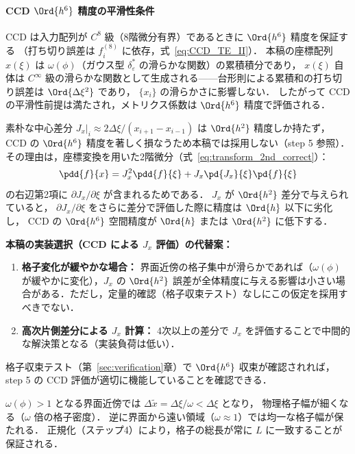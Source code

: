 \paragraph{\texorpdfstring{CCD $\Ord{h^6}$ 精度の平滑性条件}{CCD O(h^6) 精度の平滑性条件}}
CCD は入力配列が $C^8$ 級（8階微分有界）であるときに $\Ord{h^6}$ 精度を保証する
（打ち切り誤差は $f^{(8)}_i$ に依存，式~\eqref{eq:CCD_TE_II}）．
本稿の座標配列 $x(\xi)$ は $\omega(\phi)$（ガウス型 $\delta_\varepsilon^*$ の滑らかな関数）の累積積分であり，
$x(\xi)$ 自体は $C^\infty$ 級の滑らかな関数として生成される——台形則による累積和の打ち切り誤差は $\Ord{\Delta\xi^2}$ であり，
$\{x_i\}$ の滑らかさに影響しない．
したがって CCD の平滑性前提は満たされ，メトリクス係数は $\Ord{h^6}$ 精度で評価される．

\begin{tcolorbox}[warnbox, title={【重要】メトリクス係数 $J_x$ の精度と $\partial J_x/\partial\xi$ の評価}]
\label{box:grid_jx_accuracy}
素朴な中心差分 $J_x|_i \approx 2\Delta\xi/(x_{i+1}-x_{i-1})$ は $\Ord{h^2}$ 精度しか持たず，
CCD の $\Ord{h^6}$ 精度を著しく損なうため本稿では採用しない（step 5 参照）．
その理由は，座標変換を用いた2階微分（式~\eqref{eq:transform_2nd_correct}）：
\[
  \pdd{f}{x} = J_x^2 \pdd{f}{\xi} + J_x \pd{J_x}{\xi} \pd{f}{\xi}
\]
の右辺第2項に $\partial J_x/\partial \xi$ が含まれるためである．
$J_x$ が $\Ord{h^2}$ 差分で与えられていると，
$\partial J_x/\partial\xi$ をさらに差分で評価した際に精度は $\Ord{h}$ 以下に劣化し，
CCD の $\Ord{h^6}$ 空間精度が $\Ord{h}$ または $\Ord{h^2}$ に低下する．

\textbf{本稿の実装選択（CCD による $J_x$ 評価）の代替案：}
\begin{enumerate}
  \item \textbf{格子変化が緩やかな場合：} 界面近傍の格子集中が滑らかであれば（$\omega(\phi)$ が緩やかに変化），$J_x$ の $\Ord{h^2}$ 誤差が全体精度に与える影響は小さい場合がある．ただし，定量的確認（格子収束テスト）なしにこの仮定を採用すべきでない．
  \item \textbf{高次片側差分による $J_x$ 計算：} 4次以上の差分で $J_x$ を評価することで中間的な解決策となる（実装負荷は低い）．
\end{enumerate}
格子収束テスト（第~\ref{sec:verification}章）で $\Ord{h^6}$ 収束が確認されれば，
step 5 の CCD 評価が適切に機能していることを確認できる．
\end{tcolorbox}

\noindent
$\omega(\phi) > 1$ となる界面近傍では $\Delta\tilde{x} = \Delta\xi/\omega < \Delta\xi$ となり，
物理格子幅が細くなる（$\omega$ 倍の格子密度）．
逆に界面から遠い領域（$\omega \approx 1$）では均一な格子幅が保たれる．
正規化（ステップ4）により，格子の総長が常に $L$ に一致することが保証される．

